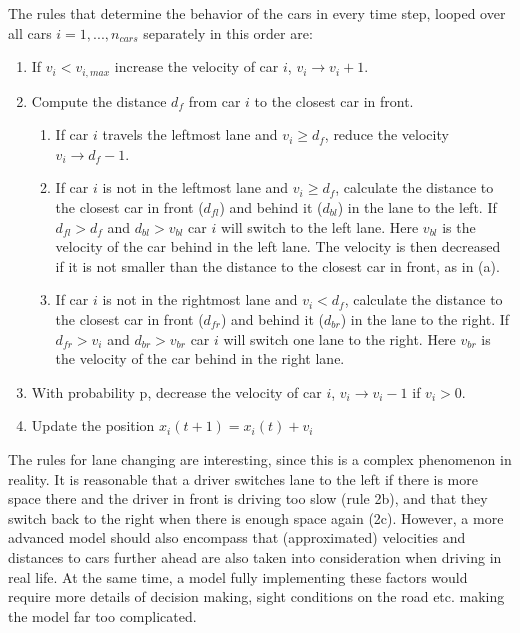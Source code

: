 \documentclass[a4paper,12pt]{article}
\begin{document}
The rules that determine the behavior of the cars in every time step, looped over all cars $i=1,...,n_{cars}$ separately in this order are:

\begin{enumerate}
	\item If $v_i < v_{i, max}$ increase the velocity of car $i$, $v_i \rightarrow v_i+1$.
	\item Compute the distance $d_f$ from car $i$ to the closest car in front. 
	\begin{enumerate}
		\item If car $i$ travels the leftmost lane and $v_i \geq d_f$, reduce the velocity $v_i \rightarrow d_f-1$. 
		\item If car $i$ is not in the leftmost lane and $v_i \geq d_f$, calculate the distance to the closest car in front ($d_{fl}$) and behind it ($d_{bl}$) in the lane to the left. If $d_{fl}>d_f$ and $d_{bl}>v_{bl}$ car $i$ will switch to the left lane. Here $v_{bl}$ is the velocity of the car behind in the left lane. The velocity is then decreased if it is not smaller than the distance to the closest car in front, as in (a). 
		\item If car $i$ is not in the rightmost lane and $v_i < d_f$, calculate the distance to the closest car in front ($d_{fr}$) and behind it ($d_{br}$) in the lane to the right. If $d_{fr}>v_i$ and $d_{br} > v_{br}$ car $i$ will switch one lane to the right. Here $v_{br}$ is the velocity of the car behind in the right lane.
	\end{enumerate}
	
\item With probability p, decrease the velocity of car $i$, $v_i \rightarrow v_{i}-1$ if $v_i>0$. 
\item Update the position $x_i(t+1) = x_i(t) +v_i$
\end{enumerate}

The rules for lane changing are interesting, since this is a complex phenomenon in reality. It is reasonable that a driver switches lane to the left if there is more space there and the driver in front is driving too slow (rule 2b), and that they switch back to the right when there is enough space again (2c). However, a more advanced model should also encompass that (approximated) velocities and distances to cars further ahead are also taken into consideration when driving in real life. At the same time, a model fully implementing these factors would require more details of decision making, sight conditions on the road etc. making the model far too complicated.\\
\end{document}
